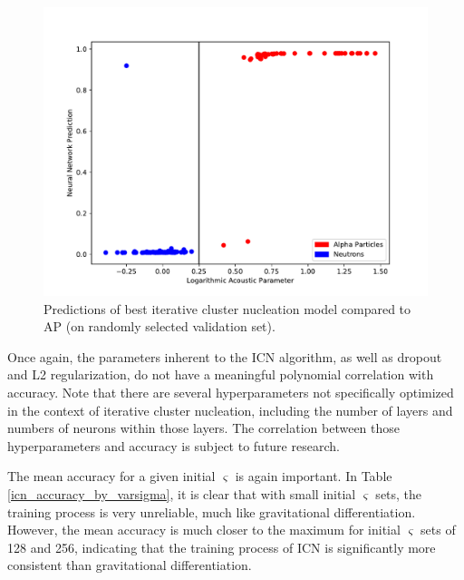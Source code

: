 \documentclass[10pt]{article}
\begin{document}
\begin{figure}[h]
    \centering
    \includegraphics[width=\textwidth]{icn_grid_search}
    \caption{\label{icn_grid_search} Predictions of best iterative cluster nucleation model compared to AP (on randomly selected validation set).}
\end{figure}

Once again, the parameters inherent to the ICN algorithm, as well as dropout and L2 regularization, do not have a meaningful polynomial correlation with accuracy. Note that there are several hyperparameters not specifically optimized in the context of iterative cluster nucleation, including the number of layers and numbers of neurons within those layers. The correlation between those hyperparameters and accuracy is subject to future research.

The mean accuracy for a given initial $\varsigma$ is again important. In Table \ref{icn_accuracy_by_varsigma}, it is clear that with small initial $\varsigma$ sets, the training process is very unreliable, much like gravitational differentiation. However, the mean accuracy is much closer to the maximum for initial $\varsigma$ sets of 128 and 256, indicating that the training process of ICN is significantly more consistent than gravitational differentiation.
\end{document}
